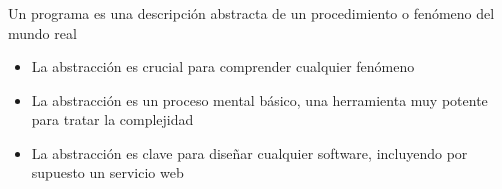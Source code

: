 \documentclass[ucs]{beamer}
\begin{document}
\begin{frame}[fragile]
\frametitle{}
Un programa es una descripción abstracta de un procedimiento o fenómeno del mundo real
\begin{itemize}
\item
La abstracción es crucial para comprender cualquier fenómeno
\item
La abstracción es un proceso mental básico, una herramienta muy potente para tratar la complejidad 
\item
La abstracción es clave para diseñar cualquier software, incluyendo por supuesto un servicio web
\end{itemize}

\end{frame}
\end{document}
